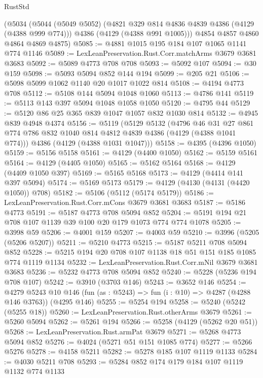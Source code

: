 \begin{lexlean}{RustStd}
\begin{coremodule}
{\begin{coremodule}
{{{{{{{{{{{{{{    (@5034
      (@5044
        (@5049 @5052)
        (@4821 @329 @814 @4836 @4839 @4386 (@4129 (@4388 @999 @774)))
        @4386
        (@4129 (@4388 @991 @1005)))
      @4854
      @4857
      @4860
      @4864
      @4869
      @4875)
@5085 := @4881 @1015 @195 @184 @107 @1065 @1141 @774 @1146
@5089 := LexLeanPreservation.Rust.Corr.matchArms @3679 @3681 @3683
@5092 := @5089 @4773 @708 @708
@5093 := @5092 @107
@5094 := @30 @159
@5098 := @5093 @5094 @852 @144 @194
@5099 := @205 @21
@5106 := @5098 @5099 @1062 @1140 @20 @1017 @1022 @814
@5108 := @4194 @4773 @708
@5112 := @5108 @144 @5094 @1048 @1060
@5113 := @4786 @141
@5119 := @5113 @143 @397 @5094 @1048 @1058 @1050
@5120 := @4795 @44
@5129 := @5120 @86 @25 @365 @839 @1047 @1057 @832 @1030 @814
@5132 := @4945 @839 @4948 @4374
@5156 := @5119
    (@5129
      @5132
      (@4796
        @46
        @31
        @27
        @861
        @774
        @786
        @832
        @1040
        @814
        @4812
        @4839
        @4386
        (@4129 (@4388 @1041 @774)))
      @4386
      (@4129 (@4388 @1031 @1047)))
@5158 := @4395 (@4396 @1050)
@5159 := @5156 @5158
@5161 := @4129 (@4400 @1050)
@5162 := @5159 @5161
@5164 := @4129 (@4405 @1050)
@5165 := @5162 @5164
@5168 := @4129 (@4409 @1050 @397)
@5169 := @5165 @5168
@5173 := @4129 (@4414 @141 @397 @5094)
@5174 := @5169 @5173
@5179 := @4129 (@4130 (@4131 (@4420 @1050)) @708)
@5182 := @5106 (@5112 (@5174 @5179))
@5186 := LexLeanPreservation.Rust.Corr.mCons @3679 @3681 @3683
@5187 := @5186 @4773
@5191 := @5187 @4773 @708 @5094 @852
@5204 := @5191 @194 @21 @708 @107 @1139 @39 @100 @20 @179 @1073 @774 @774 @1078
@5205 := @3998 @59
@5206 := @4001 @159
@5207 := @4003 @59
@5210 := @3996 (@5205 (@5206 @5207))
@5211 := @5210 @4773
@5215 := @5187 @5211 @708 @5094 @852
@5228 := @5215 @194 @20 @708 @107 @1138 @18 @51 @151 @185 @1085 @774 @1119 @1134
@5232 := LexLeanPreservation.Rust.Corr.mNil @3679 @3681 @3683
@5236 := @5232 @4773 @708 @5094 @852
@5240 := @5228 (@5236 @194 @708 @107)
@5242 := @3910 (@3703 @146)
@5243 := @3652 @146
@5254 := @4279
    @5243
    @10
    @146
    (fun (as : @5243) => fun (i : @10) => @4287 (@4288 @146 @3763))
    (@4295 @146)
@5255 := @5254 @194
@5258 := @5240 (@5242 (@5255 @18))
@5260 := LexLeanPreservation.Rust.otherArms @3679
@5261 := @5260 @5094
@5262 := @5261 @194
@5266 := @5258 (@4129 (@5262 @20 @51))
@5268 := LexLeanPreservation.Rust.armPat @3679
@5271 := @5268 @4773 @5094 @852
@5276 := @4024 (@5271 @51 @151 @1085 @774)
@5277 := @5266 @5276
@5278 := @4158 @5211
@5282 := @5278 @185 @107 @1119 @1133
@5284 := @4030 @5211 @708
@5293 := @5284 @852 @174 @179 @184 @107 @1119 @1132 @774 @1133
}}}}}}}}}}}}}}
\end{coremodule}}
\end{coremodule}
\end{lexlean}
